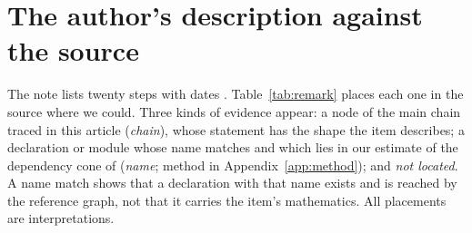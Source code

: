 \section{The author's description against the source}\label{sec:remark}

The note lists twenty steps with dates \cite{remark}. Table~\ref{tab:remark} places each one in the
source where we could. Three kinds of evidence appear: a node of the main chain traced in this article
(\emph{chain}), whose statement has the shape the item describes; a declaration or module whose name
matches and which lies in our estimate of the dependency cone of 
(\emph{name}; method in Appendix~\ref{app:method}); and \emph{not located}. A name match shows that a
declaration with that name exists and is reached by the reference graph, not that it carries the
item's mathematics. All placements are interpretations.

